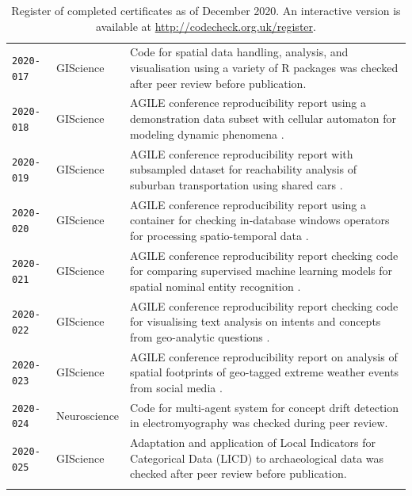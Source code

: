 \documentclass[12pt]{article}
\begin{document}
\begin{table}
\begin{tabular}{llp{12cm}}
    \texttt{2020-017}  \cite{cert-2020-017} & GIScience & Code for spatial data handling, analysis, and visualisation using a variety of R packages \cite{Bivand2020} was checked after peer review before publication. \\ %
    \texttt{2020-018}  \cite{cert-2020-018} & GIScience & AGILE conference reproducibility report using a demonstration data subset with cellular automaton for modeling dynamic phenomena \cite{Hojati2020}. \\ %
    \texttt{2020-019}  \cite{cert-2020-019} & GIScience & AGILE conference reproducibility report with subsampled dataset for reachability analysis of suburban transportation using shared cars \cite{Illium2020}. \\
    \texttt{2020-020}  \cite{cert-2020-020} & GIScience & AGILE conference reproducibility report using a container for checking in-database windows operators for processing spatio-temporal data \cite{Werner2020}. \\ %
    \texttt{2020-021}  \cite{cert-2020-021} & GIScience & AGILE conference reproducibility report checking code for comparing supervised machine learning models for spatial nominal entity recognition \cite{Medad2020}. \\ %
    \texttt{2020-022}  \cite{cert-2020-022} & GIScience & AGILE conference reproducibility report checking code for visualising text analysis on intents and concepts from geo-analytic questions \cite{Xu2020}. \\ %
    \texttt{2020-023}  \cite{cert-2020-023} & GIScience & AGILE conference reproducibility report on analysis of spatial footprints of geo-tagged extreme weather events from social media \cite{Owuor2020}. \\
    \texttt{2020-024}  \cite{cert-2020-024} & Neuroscience & Code for multi-agent system for concept drift detection in electromyography \cite{vieira_driftage_2020} was checked during peer review. \\ %
    \texttt{2020-025}  \cite{cert-2020-025} & GIScience & Adaptation and application of Local Indicators for Categorical Data (LICD) to archaeological data \cite{carrer_application_2021} was checked after peer review before publication. \\ %
    \\ \bottomrule
  \end{tabular}
  \caption{Register of completed certificates as of December 2020. An interactive version
  is available at \url{http://codecheck.org.uk/register}.
  }
  \label{tab:register}
\end{table}
\end{document}
